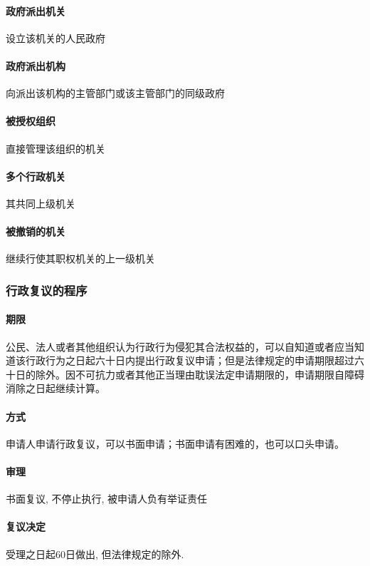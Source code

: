 \paragraph{政府派出机关} 设立该机关的人民政府

\paragraph{政府派出机构} 向派出该机构的主管部门或该主管部门的同级政府

\paragraph{被授权组织} 直接管理该组织的机关

\paragraph{多个行政机关} 其共同上级机关

\paragraph{被撤销的机关} 继续行使其职权机关的上一级机关 

\subsubsection{行政复议的程序}

\paragraph{期限} 公民、法人或者其他组织认为行政行为侵犯其合法权益的，可以自知道或者应当知道该行政行为之日起六十日内提出行政复议申请；但是法律规定的申请期限超过六十日的除外。因不可抗力或者其他正当理由耽误法定申请期限的，申请期限自障碍消除之日起继续计算。

\paragraph{方式} 申请人申请行政复议，可以书面申请；书面申请有困难的，也可以口头申请。

\paragraph{审理} 书面复议, 不停止执行, 被申请人负有举证责任

\paragraph{复议决定} 受理之日起60日做出, 但法律规定的除外.

